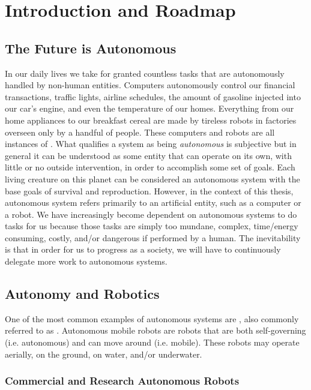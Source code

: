 
\chapter{Introduction and Roadmap}

\section{The Future is Autonomous}
In our daily lives we take for granted countless tasks that are autonomously handled by non-human entities. Computers autonomously control our financial transactions, traffic lights, airline schedules, the amount of gasoline injected into our car's engine, and even the temperature of our homes. Everything from our home appliances to our breakfast cereal are made by tireless robots in factories overseen only by a handful of people. These computers and robots are all instances of . What qualifies a system as being \textit{autonomous} is subjective but in general it can be understood as some entity that can operate on its own, with little or no outside intervention, in order to accomplish some set of goals. Each living creature on this planet can be considered an autonomous system with the base goals of survival and reproduction. However, in the context of this thesis, autonomous system refers primarily to an artificial entity, such as a computer or a robot. We have increasingly become dependent on autonomous systems to do tasks for us because those tasks are simply too mundane, complex, time/energy consuming, costly, and/or dangerous if performed by a human. The inevitability is that in order for us to progress as a society, we will have to continuously delegate more work to autonomous systems.
  
\section{Autonomy and Robotics}
One of the most common examples of autonomous systems are , also commonly referred to as . Autonomous mobile robots are robots that are both self-governing (i.e. autonomous) and can move around (i.e. mobile). These robots may operate aerially, on the ground, on water, and/or underwater.

\subsection{Commercial and Research Autonomous Robots}


